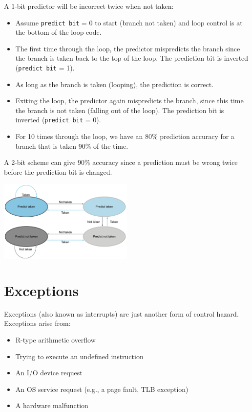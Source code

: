 A 1-bit predictor will be incorrect twice when not taken:
\begin{itemize}
  \item Assume \texttt{predict bit} = 0 to start (branch not taken) and loop control is at the bottom of the loop code.
  \item The first time through the loop, the predictor mispredicts the branch since the branch is taken back to the top of the loop. The prediction bit is inverted (\texttt{predict bit} = 1).
  \item As long as the branch is taken (looping), the prediction is correct.
  \item Exiting the loop, the predictor again mispredicts the branch, since this time the branch is not taken (falling out of the loop). The prediction bit is inverted (\texttt{predict bit} = 0).
  \item For 10 times through the loop, we have an 80\% prediction accuracy for a branch that is taken 90\% of the time.
\end{itemize}

A 2-bit scheme can give 90\% accuracy since a prediction must be wrong twice before the prediction bit is changed.
\begin{center}
  \includegraphics[width=0.5\textwidth]{Figure/branch_prediction.png}
\end{center}
\newpage

\section{Exceptions}
Exceptions (also known as interrupts) are just another form of control hazard. Exceptions arise from:
\begin{itemize}
  \item R-type arithmetic overflow
  \item Trying to execute an undefined instruction
  \item An I/O device request
  \item An OS service request (e.g., a page fault, TLB exception)
  \item A hardware malfunction
\end{itemize}

